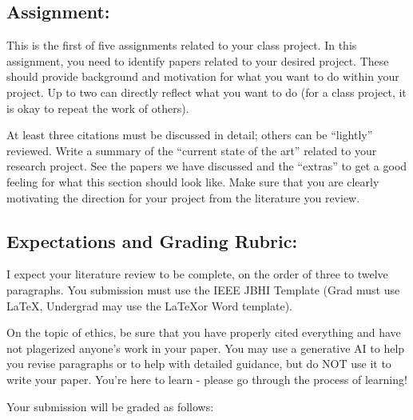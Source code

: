 \documentclass[11pt]{article}
\begin{document}
\subsection*{Assignment:}
This is the first of five assignments related to your class project. In this assignment, you need to identify papers related to your desired project. These should provide background and motivation for what you want to do within your project. Up to two can directly reflect what you want to do (for a class project, it is okay to repeat the work of others).

At least three citations must be discussed in detail; others can be ``lightly'' reviewed.  Write a summary of the ``current state of the art'' related to your research project.  See the papers we have discussed and the ``extras'' to get a good feeling for what this section should look like. Make sure that you are clearly motivating the direction for your project from the literature you review.


\subsection*{Expectations and Grading Rubric:}
I expect your literature review to be complete, on the order of three to twelve paragraphs. You submission must use the IEEE JBHI Template (Grad must use \LaTeX, Undergrad may use the \LaTeX or Word template).

On the topic of ethics, be sure that you have properly cited everything and have not plagerized anyone's work in your paper.  You may use a generative AI to help you revise paragraphs or to help with detailed guidance, but do NOT use it to write your paper.  You're here to learn - please go through the process of learning!

Your submission will be graded as follows:
\end{document}
